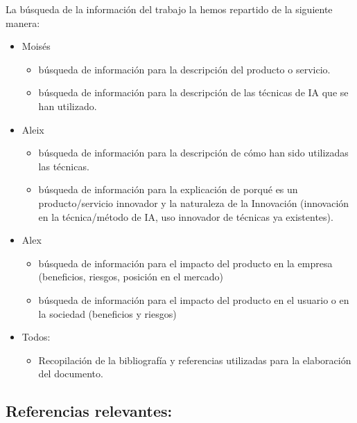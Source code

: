 La búsqueda de la información del trabajo la hemos repartido de la siguiente manera:
\begin{itemize}
\item Moisés
    \begin{itemize}
\item búsqueda de información para la descripción del producto o servicio.
\item búsqueda de información para la descripción de las técnicas de IA que se han utilizado.
    \end{itemize}
\item Aleix
    \begin{itemize}
\item búsqueda de información para la descripción de cómo han sido utilizadas las técnicas.
\item búsqueda de información para la explicación de porqué es un producto/servicio innovador y la naturaleza de la Innovación (innovación en la técnica/método de IA, uso innovador de técnicas ya existentes).
    \end{itemize}
\item Alex
    \begin{itemize}
\item búsqueda de información para el impacto del producto en la empresa (beneficios, riesgos, posición en el mercado)
\item búsqueda de información para el impacto del producto en el usuario o en la sociedad (beneficios y riesgos)
    \end{itemize}
\item Todos:
    \begin{itemize}
\item Recopilación de la bibliografía y referencias utilizadas para la elaboración del documento.
    \end{itemize}
\end{itemize}

\subsection{Referencias relevantes:}

